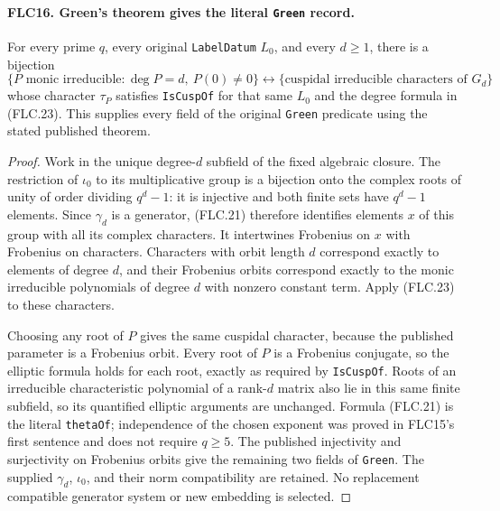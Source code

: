 \documentclass[11pt,a4paper]{article}
\numberwithin{equation}{section}
\theoremstyle{remark}\newtheorem{remark}[theorem]{Remark}
\begin{document}
\paragraph{FLC16. Green's theorem gives the literal \texttt{Green} record.}
\label{claim:FLC16}
For every prime $q$, every original \texttt{Label\allowbreak Datum} $L_0$,
and every $d\ge1$, there is a bijection
\[
 \{P\text{ monic irreducible}:\deg P=d,\ P(0)\ne0\}
       \longleftrightarrow
       \{\text{cuspidal irreducible characters of }G_d\}
 \tag{FLC.24}
\]
whose character $\tau_P$ satisfies \texttt{Is\allowbreak Cusp\allowbreak Of} for that
same $L_0$ and the degree formula in (FLC.23).
This supplies every field of the original \texttt{Green}
predicate using the stated published theorem.
\begin{proof}
Work in the unique degree-$d$ subfield of the fixed algebraic
closure.  The restriction of $\iota_0$ to its multiplicative
group is a bijection onto the complex roots of unity of
order dividing $q^d-1$: it is injective and both finite sets
have $q^d-1$ elements.  Since $\gamma_d$ is a generator,
(FLC.21) therefore identifies elements $x$ of this group
with all its complex characters.  It intertwines Frobenius
on $x$ with Frobenius on characters.  Characters with orbit
length $d$ correspond exactly to elements of degree $d$,
and their Frobenius orbits correspond exactly to the monic
irreducible polynomials of degree $d$ with nonzero constant
term.  Apply (FLC.23) to these characters.

Choosing any root of $P$ gives the same cuspidal character,
because the published parameter is a Frobenius orbit.
Every root of $P$ is a Frobenius conjugate, so the elliptic
formula holds for each root, exactly as required by
\texttt{Is\allowbreak Cusp\allowbreak Of}.  Roots of an irreducible characteristic
polynomial of a rank-$d$ matrix also lie in this same finite
subfield, so its quantified elliptic arguments are unchanged.
Formula (FLC.21) is the literal \texttt{theta\allowbreak Of}; independence
of the chosen exponent was proved in FLC15's first sentence
and does not require $q\ge5$.
The published injectivity and surjectivity on Frobenius
orbits give the remaining two fields of \texttt{Green}.
The supplied $\gamma_d$, $\iota_0$, and their norm compatibility
are retained.  No replacement compatible generator system
or new embedding is selected.
\end{proof}

\end{document}
